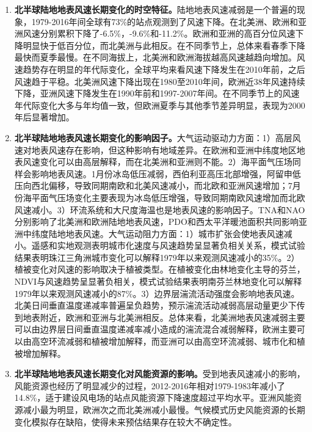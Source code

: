\begin{enumerate}

\item \textbf{北半球陆地地表风速长期变化的时空特征。}陆地地表风速减弱是一个普遍的现象，1979-2016年间全球有73\%的站点观测到了风速下降。在北美洲、欧洲和亚洲风速分别累积下降了-6.5\%，-9.6\%和-11.2\%。欧洲和亚洲的高百分位风速下降明显快于低百分位，而北美洲与此相反。在不同季节上，总体来看春季下降最快而夏季最慢。在不同海拔上，北美洲和欧洲海拔越高风速越趋向增加。风速趋势存在明显的年代际变化，全球平均来看风速下降发生在2010年前，之后风速趋于平稳。北美洲风速下降出现在1980至2010年间，欧洲近38年风速持续下降，亚洲风速下降发生在1990年前和1997-2007年间。在不同季节上的风速年代际变化大多与年均值一致，但欧洲夏季与其他季节差异明显，表现为2000年后显著增加。

\item \textbf{北半球陆地地表风速长期变化的影响因子。}大气运动驱动力方面：1）高层风速对地表风速存在影响，但这种影响有地域差异。在欧洲和亚洲中纬度地区地表风速变化可以由高层解释，而在北美洲和亚洲则不能。2）海平面气压场同样会影响地表风速。1月份冰岛低压减弱，西伯利亚高压北部增强，阿留申低压向西北偏移，导致同期南欧和北美风速减小，而北欧和亚洲风速增加；7月份海平面气压场变化主要表现为冰岛低压增强，导致同期南欧风速增加而北欧风速减小。3）环流系统和大尺度海温也是地表风速的影响因子。TNA和NAO分别影响了北美洲和欧洲陆地地表风速，PDO和西太平洋暖池面积共同影响亚洲中纬度陆地地表风速。大气运动阻力方面：1）城市扩张会使地表风速减小。遥感和实地观测表明城市化速度与风速趋势呈显著负相关关系，模式试验结果表明珠江三角洲城市变化可以解释1979年以来观测风速减小的35\%。2）植被变化对风速的影响取决于植被类型。在植被变化由林地变化主导的芬兰，NDVI与风速趋势呈显著负相关，模式试验结果表明南芬兰林地变化可以解释1979年以来观测风速减小的87\%。3）边界层湍流活动强度会影响地表风速。北美日间垂直温度递减率普遍呈负趋势，预示湍流活动减弱高层动量更少下传到地表附近，欧洲和亚洲与北美洲相反。总体来看，北美洲地表风速减弱主要可以由边界层日间垂直温度递减率减小造成的湍流混合减弱解释，欧洲主要可以由高空环流减弱和植被增加解释，而亚洲可以由高空环流减弱、城市化和植被增加解释。

\item \textbf{北半球陆地地表风速长期变化对风能资源的影响。}受到地表风速减小的影响，风能资源也经历了明显减少的过程，2012-2016年相对1979-1983年减小了14.8\%，适于建设风电场的站点风能资源下降速度超过平均水平。亚洲风能资源减小最为明显，欧洲次之而北美洲减小最慢。气候模式历史风能资源的长期变化模拟存在缺陷，使得未来预估结果存在较大不确定性。

\end{enumerate}

